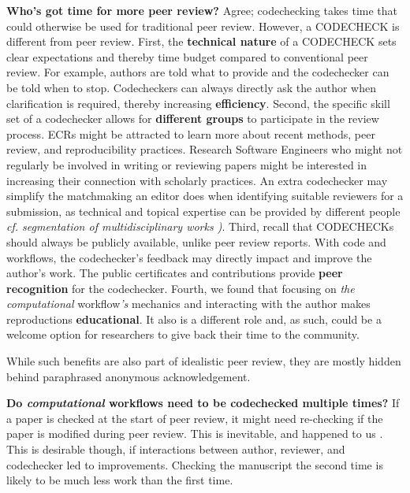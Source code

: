 \documentclass[12pt]{article}
\newcommand{\rev}[1]{\textit{#1}}
\begin{document}
\textbf{Who's got time for more peer review?} Agree; codechecking
takes time that could otherwise be used for traditional peer review.
However, a CODECHECK is different from peer review.  First, the
\textbf{technical nature} of a CODECHECK sets clear expectations and
thereby time budget compared to conventional peer review.  For
example, authors are told what to provide and the codechecker can be
told when to stop.  Codecheckers can always directly ask the author
when clarification is required, thereby increasing
\textbf{efficiency}.  Second, the specific skill set of a codechecker
allows for \textbf{different groups} to participate in the review
process.  ECRs might be attracted to learn more about recent methods,
peer review, and reproducibility practices.  Research Software
Engineers  %
who might not regularly be involved in writing or reviewing papers
might be interested in increasing their connection with scholarly
practices.  An extra codechecker may simplify the matchmaking an
editor does when identifying suitable reviewers for a submission,
as technical and topical expertise can be provided by different
people \rev{cf. segmentation of multidisciplinary
works \cite{dinakaran_proposal_2021})}.
Third, recall that CODECHECKs should always be publicly
available, unlike peer review reports.  With code and workflows, the
codechecker's feedback may directly impact and improve the author's
work.  The public certificates and contributions provide \textbf{peer
  recognition} for the codechecker.  Fourth, we found that focusing on
\rev{the computational} workflow\rev{'s} mechanics and interacting with the author makes reproductions
\textbf{educational}. It also is a different role and, as such, could
be a welcome option for researchers to give back their time to the
community.

While such benefits are also part of idealistic peer review, they are
mostly hidden behind paraphrased anonymous acknowledgement.

\textbf{Do \rev{computational} workflows need to be codechecked multiple times?}  If a
paper is checked at the start of peer review, it might need
re-checking if the paper is modified during peer review.  This is
inevitable, and happened to us \cite{cert-2020-012}. This is desirable
though, if interactions between author, reviewer, and codechecker led
to improvements.  Checking the manuscript the second time is likely to
be much less work than the first time.
\end{document}
